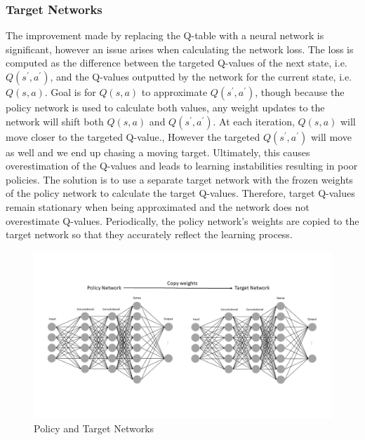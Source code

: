 \documentclass[notitlepage,a4paper,11pt]{article}
\begin{document}
\subsubsection{Target Networks}
The improvement made by replacing the Q-table with a neural network is significant, however an issue arises when calculating the network loss. The loss is computed as the difference between the targeted Q-values of the next state, i.e. $Q(s^\prime, a^\prime)$, and the Q-values outputted by the network for the current state, i.e. $Q(s,a)$. Goal is for $Q(s,a)$ to approximate $Q(s^\prime, a^\prime)$, though because the policy network is used to calculate both values, any weight updates to the network will shift both $Q(s,a)$ and $Q(s^\prime, a^\prime)$. At each iteration, $Q(s,a)$ will move closer to the targeted Q-value., However the targeted $Q(s^\prime, a^\prime)$ will move as well and we end up chasing a moving target. Ultimately, this causes overestimation of the Q-values and leads to learning instabilities resulting in poor policies. The solution is to use a separate target network with the frozen weights of the policy network to calculate the target Q-values. Therefore, target Q-values remain stationary when being approximated and the network does not overestimate Q-values. Periodically, the policy network's weights are copied to the target network so that they accurately reflect the learning process.


\begin{figure}[!htb]
\centering
\includegraphics[trim={0 3cm 0 3cm},clip,width=1\linewidth]{figs/policy_target_nn.png}
\caption{Policy and Target Networks} \label{fig:2}
\end{figure}
\end{document}
